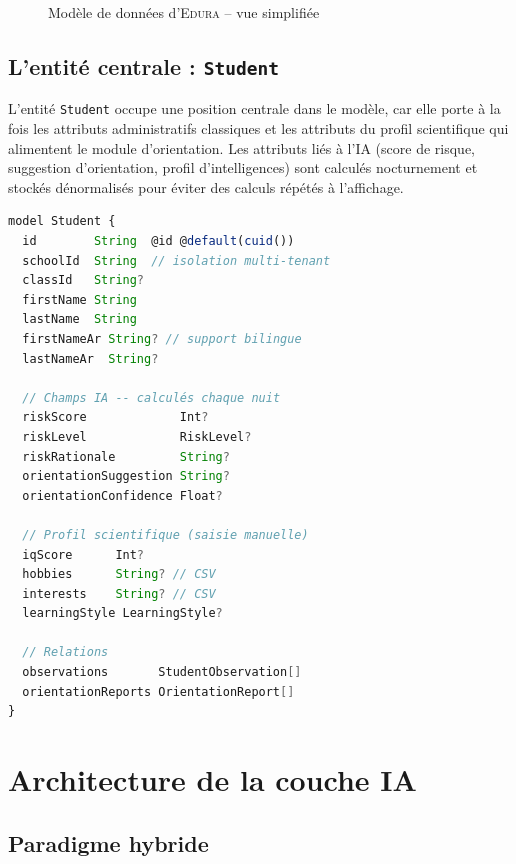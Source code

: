\documentclass[12pt,a4paper,oneside]{report}
\newcommand{\edura}{\textsc{Edura}}
\begin{document}
\begin{figure}[H]
\centering
{}
\caption{Modèle de données d'\edura{} -- vue simplifiée}
\label{fig:modele_donnees}
\end{figure}

\subsection{L'entité centrale : \texttt{Student}}

L'entité \texttt{Student} occupe une position centrale dans le modèle, car elle porte à la fois les attributs administratifs classiques et les attributs du profil scientifique qui alimentent le module d'orientation. Les attributs liés à l'IA (score de risque, suggestion d'orientation, profil d'intelligences) sont calculés nocturnement et stockés dénormalisés pour éviter des calculs répétés à l'affichage.

\begin{lstlisting}[language=TypeScript, caption={Extrait du schéma Prisma -- table Student}]
model Student {
  id        String  @id @default(cuid())
  schoolId  String  // isolation multi-tenant
  classId   String?
  firstName String
  lastName  String
  firstNameAr String? // support bilingue
  lastNameAr  String?

  // Champs IA -- calculés chaque nuit
  riskScore             Int?
  riskLevel             RiskLevel?
  riskRationale         String?
  orientationSuggestion String?
  orientationConfidence Float?

  // Profil scientifique (saisie manuelle)
  iqScore      Int?
  hobbies      String? // CSV
  interests    String? // CSV
  learningStyle LearningStyle?

  // Relations
  observations       StudentObservation[]
  orientationReports OrientationReport[]
}
\end{lstlisting}

\section{Architecture de la couche IA}

\subsection{Paradigme hybride}
\end{document}
